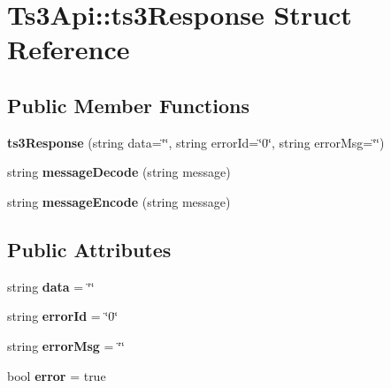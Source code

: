 \hypertarget{struct_ts3_api_1_1ts3_response}{}\section{Ts3\+Api\+:\+:ts3\+Response Struct Reference}
\label{struct_ts3_api_1_1ts3_response}
\subsection*{Public Member Functions}
\begin{DoxyCompactItemize}
\item 
{\bfseries ts3\+Response} (string data=\char`\"{}\char`\"{}, string error\+Id=\char`\"{}0\char`\"{}, string error\+Msg=\char`\"{}\char`\"{})\hypertarget{struct_ts3_api_1_1ts3_response_a042b64ba362ee4c20abeb5b1019a4f2e}{}\label{struct_ts3_api_1_1ts3_response_a042b64ba362ee4c20abeb5b1019a4f2e}

\item 
string {\bfseries message\+Decode} (string message)\hypertarget{struct_ts3_api_1_1ts3_response_ab86f3de75a74609f5d193593bc5dcd75}{}\label{struct_ts3_api_1_1ts3_response_ab86f3de75a74609f5d193593bc5dcd75}

\item 
string {\bfseries message\+Encode} (string message)\hypertarget{struct_ts3_api_1_1ts3_response_a389f5213e2e3c28e6dd23cd035b954ce}{}\label{struct_ts3_api_1_1ts3_response_a389f5213e2e3c28e6dd23cd035b954ce}

\end{DoxyCompactItemize}
\subsection*{Public Attributes}
\begin{DoxyCompactItemize}
\item 
string {\bfseries data} = \char`\"{}\char`\"{}\hypertarget{struct_ts3_api_1_1ts3_response_aa3ed5cc6cc00af0631109af4cc1537b9}{}\label{struct_ts3_api_1_1ts3_response_aa3ed5cc6cc00af0631109af4cc1537b9}

\item 
string {\bfseries error\+Id} = \char`\"{}0\char`\"{}\hypertarget{struct_ts3_api_1_1ts3_response_a5d1bfb46754667196c77d5b8cb0fc00f}{}\label{struct_ts3_api_1_1ts3_response_a5d1bfb46754667196c77d5b8cb0fc00f}

\item 
string {\bfseries error\+Msg} = \char`\"{}\char`\"{}\hypertarget{struct_ts3_api_1_1ts3_response_a49ce712e761bd347b69c2a3bdf827e57}{}\label{struct_ts3_api_1_1ts3_response_a49ce712e761bd347b69c2a3bdf827e57}

\item 
bool {\bfseries error} = true\hypertarget{struct_ts3_api_1_1ts3_response_a07b75d89c300e345763933e062c5777f}{}\label{struct_ts3_api_1_1ts3_response_a07b75d89c300e345763933e062c5777f}

\end{DoxyCompactItemize}


